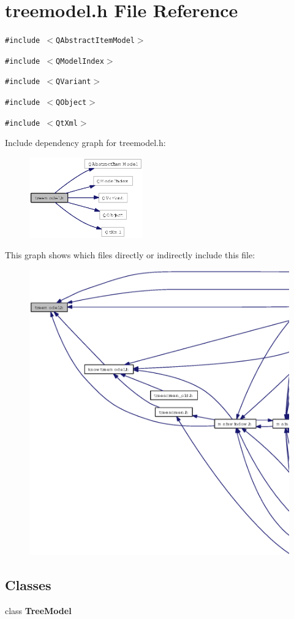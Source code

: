 \section{treemodel.h File Reference}
\label{treemodel_8h}
{\tt \#include $<$QAbstract\-Item\-Model$>$}\par
{\tt \#include $<$QModel\-Index$>$}\par
{\tt \#include $<$QVariant$>$}\par
{\tt \#include $<$QObject$>$}\par
{\tt \#include $<$Qt\-Xml$>$}\par


Include dependency graph for treemodel.h:\begin{figure}[H]
\begin{center}
\leavevmode
\includegraphics[width=139pt]{treemodel_8h__incl}
\end{center}
\end{figure}


This graph shows which files directly or indirectly include this file:\begin{figure}[H]
\begin{center}
\leavevmode
\includegraphics[width=391pt]{treemodel_8h__dep__incl}
\end{center}
\end{figure}
\subsection*{Classes}
\begin{CompactItemize}
\item 
class {\bf Tree\-Model}
\end{CompactItemize}
